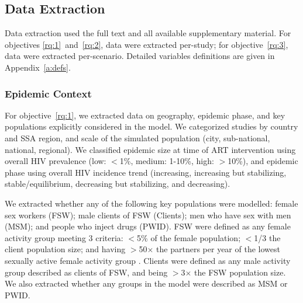 \subsection{Data Extraction}
\label{ss:meth:data}
Data extraction used the full text and all available supplementary material.
For objectives \ref{rq:1}~and~\ref{rq:2}, data were extracted per-study;
for objective~\ref{rq:3}, data were extracted per-scenario.
Detailed variables definitions are given in Appendix~\ref{a:defs}.
\subsubsection{Epidemic Context}
\label{sss:meth:context}
For objective~\ref{rq:1}, we extracted data on
geography, epidemic phase, and key populations explicitly considered in the model.
We categorized studies by country and SSA region, and
scale of the simulated population (city, sub-national, national, regional).
We classified epidemic size at time of ART intervention using
overall HIV prevalence (low: $<$1\%, medium: 1-10\%, high: $>$10\%),
and epidemic phase using overall HIV incidence trend
(increasing, increasing but stabilizing, stable/equilibrium, decreasing but stabilizing, and decreasing).
\par
We extracted whether any of the following key populations were modelled:
female sex workers (FSW);
male clients of FSW (Clients);
men who have sex with men (MSM); and
people who inject drugs (PWID).
FSW were defined as any female activity group meeting 3 criteria:
{$<$5\%} of the female population;
{$<$1/3} the client population size; and
having {$>$50$\times$} the partners per year of
the lowest sexually active female activity group \cite{Vandepitte2006,Scorgie2012}.
Clients were defined as any male activity group
described as clients of FSW, and being {$>$3$\times$} the FSW population size.
We also extracted whether any groups in the model were described as MSM or PWID.
